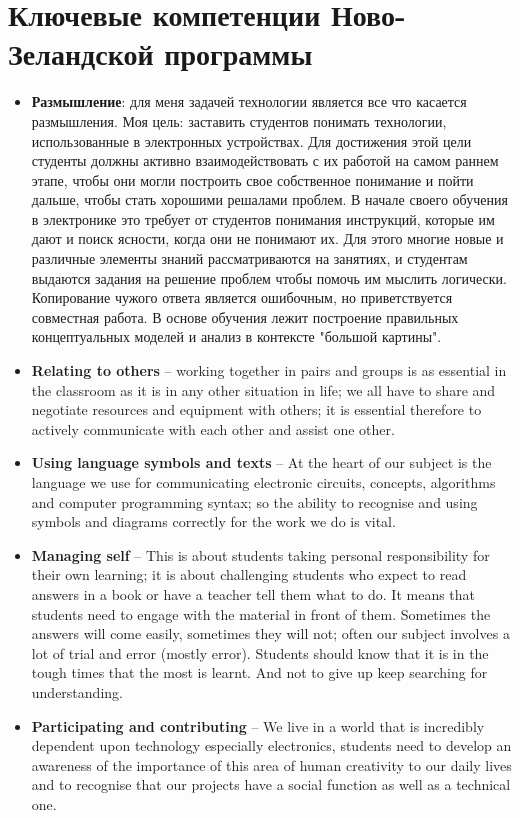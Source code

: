 \section{Ключевые компетенции Ново-Зеландской программы}

\begin{itemize}

\item\textbf{Размышление}: для меня задачей технологии является все что касается
размышления. Моя цель: заставить студентов понимать технологии, использованные в
электронных устройствах. Для достижения этой цели студенты должны активно
взаимодействовать с их работой на самом раннем этапе, чтобы они могли построить
свое собственное понимание и пойти дальше, чтобы стать хорошими решалами
проблем. В начале своего обучения в электронике это требует от студентов
понимания инструкций, которые им дают и поиск ясности, когда они не понимают их.
Для этого многие новые и различные элементы знаний рассматриваются на занятиях,
и студентам выдаются задания на решение проблем чтобы помочь им мыслить
логически. Копирование чужого ответа является ошибочным, но приветствуется
совместная работа. В основе обучения лежит построение правильных концептуальных
моделей и анализ в контексте "большой картины".

\item\textbf{Relating to others} – working together in pairs and groups is as
essential in the classroom as it is in any other situation in life; we all have to share and negotiate resources and equipment
with others; it is essential therefore to actively communicate with each other and assist one
other.

\item\textbf{Using language symbols and texts} – At the heart of our subject is
the language we use for communicating electronic circuits, concepts, algorithms and computer programming syntax; so
the ability to recognise and using symbols and diagrams correctly for the work we do is vital.

\item\textbf{Managing self} – This is about students taking personal
responsibility for their own learning; it is about challenging students who expect to read answers in a book or have a teacher tell them
what to do. It means that students need to engage with the material in front of them.
Sometimes the answers will come easily, sometimes they will not; often our subject involves a
lot of trial and error (mostly error). Students should know that it is in the tough times that the
most is learnt. And not to give up keep searching for understanding.

\item\textbf{Participating and contributing} – We live in a world that is
incredibly dependent upon technology especially electronics, students need to develop an awareness of the importance
of this area of human creativity to our daily lives and to recognise that our projects have a
social function as well as a technical one.

\end{itemize}
